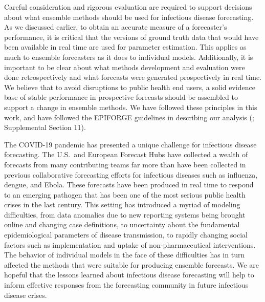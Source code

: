 \documentclass[11pt,3p,authoryear]{elsarticle}
\begin{document}
Careful consideration and rigorous evaluation are required to support decisions about what ensemble methods should be used for infectious disease forecasting. As we discussed earlier, to obtain an accurate measure of a forecaster's performance, it is critical that the versions of ground truth data that would have been available in real time are used for parameter estimation. This applies as much to ensemble forecasters as it does to individual models. Additionally, it is important to be clear about what methods development and evaluation were done retrospectively and what forecasts were generated prospectively in real time. We believe that to avoid disruptions to public health end users, a solid evidence base of stable performance in prospective forecasts should be assembled to support a change in ensemble methods. We have followed these principles in this work, and have followed the EPIFORGE guidelines in describing our analysis (\cite{pollett_2021_epiforge}; Supplemental Section 11).

The COVID-19 pandemic has presented a unique challenge for infectious disease forecasting. The U.S.\ and European Forecast Hubs have collected a wealth of forecasts from many contributing teams \textemdash far more than have been collected in previous collaborative forecasting efforts for infectious diseases such as influenza, dengue, and Ebola. These forecasts have been produced in real time to respond to an emerging pathogen that has been one of the most serious public health crises in the last century. This setting has introduced a myriad of modeling difficulties, from data anomalies due to new reporting systems being brought online and changing case definitions, to uncertainty about the fundamental epidemiological parameters of disease transmission, to rapidly changing social factors such as implementation and uptake of non-pharmaceutical interventions. The behavior of individual models in the face of these difficulties has in turn affected the methods that were suitable for producing ensemble forecasts. We are hopeful that the lessons learned about infectious disease forecasting will help to inform effective responses from the forecasting community in future infectious disease crises.



\end{document}
